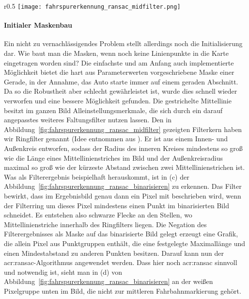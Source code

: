 \begin{wrapfigure}{r}{0.5\textwidth}
 \centering
  \texttt{[image: fahrspurerkennung\_ransac\_midfilter.png]}
  \caption{Der Kern des \\ \glqq Ringfilters\grqq}
\label{fig:fahrspurerkennung_ransac_midfilter}
\end{wrapfigure} 

\paragraph{Initialer Maskenbau} 
\label{par:maskenbau:initial}

Ein nicht zu vernachlässigendes Problem stellt allerdings noch die Initialisierung dar. Wie baut man die Masken, wenn noch keine Linienpunkte in die Karte eingetragen worden sind? Die einfachste und am Anfang auch implementierte Möglichkeit bietet die hart aus Parameterwerten vorgeschriebene Maske einer Gerade, in der Annahme, das Auto starte immer auf einem geraden Abschnitt. Da so die Robustheit aber schlecht gewährleistet ist, wurde dies schnell wieder verworfen und eine bessere Möglichkeit gefunden. Die gestrichelte Mittellinie besitzt im ganzen Bild Alleinstellungsmerkmale, die sich durch ein darauf angepasstes weiteres Faltungsfilter nutzen lassen. Den in Abbildung~\ref{fig:fahrspurerkennung_ransac_midfilter} gezeigten Filterkern haben wir \glqq Ringfilter\grqq{} genannt (Idee entnommen aus \autocite{drauschkeEchtzeitfaehigeStartpunktalgorithmenFuer2016}). Er ist aus einem Innen- und Außenkreis entworfen, sodass der Radius des inneren Kreises mindestens so groß wie die Länge eines Mittellinienstriches im Bild und der Außenkreisradius maximal so groß wie der kürzeste Abstand zwischen zwei Mittellinienstrichen ist. Was als Filterergebnis beispielhaft herauskommt, ist in (c) der Abbildung~\ref{fig:fahrspurerkennung_ransac_binarisieren} zu erkennen. Das Filter bewirkt, dass im Ergebnisbild genau dann ein Pixel mit \grqq{} beschrieben wird, wenn der Filterring um dieses Pixel mindestens einen Punkt im binarisierten Bild schneidet. Es entstehen also \glqq schwarze Flecke\grqq{} an den Stellen, wo Mittellinienstriche innerhalb des \glqq Ringfilters\grqq{} liegen. Die Negation des Filterergebnisses als Maske auf das binarisierte Bild gelegt erzeugt eine Grafik, die allein Pixel aus Punktgruppen enthält, die eine festgelegte Maximallänge und einen Mindestabstand zu anderen Punkten besitzen. Darauf kann nun der \gls{acr:ransac}-Algorithmus angewendet werden. Dass hier noch \gls{acr:ransac} sinnvoll und notwendig ist, sieht man in (d) von Abbildung~\ref{fig:fahrspurerkennung_ransac_binarisieren} an der weißen Pixelgruppe unten im Bild, die nicht zur mittleren Fahrbahnmarkierung gehört.


